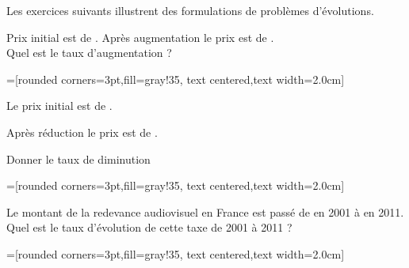 \documentclass[main.tex]{subfiles}
\begin{document}
\vspace{-2.5em}
\begin{eBox}
\noindent Les  exercices suivants illustrent des   formulations de   problèmes d'évolutions. 
\end{eBox}
\begin{exercise}\hfill 
	
	\noindent\parbox{0.70\linewidth}{
Prix initial est de . Après augmentation le prix est de . \\
Quel est le taux d'augmentation ? 
}\parbox{0.23\linewidth}{
=[rounded corners=3pt,fill=gray!35, text centered,text width=2.0cm]
}	 
\end{exercise}
\begin{exercise}\hfill 
	
	\noindent\parbox{0.70\linewidth}{
	Le prix initial est de . 
	
	Après réduction le prix est de .
	
	Donner le taux de diminution   
	}\parbox{0.23\linewidth}{
=[rounded corners=3pt,fill=gray!35, text centered,text width=2.0cm]
	}	 
\end{exercise}
 \begin{exercise}\hfill 
 	 
	\noindent\parbox{0.70\linewidth}{
Le montant de la redevance audiovisuel en France est passé de   en 2001 à   en 2011.\\
Quel est le taux d’évolution de cette taxe de 2001 à 2011 ?
}\parbox{0.23\linewidth}{
	=[rounded corners=3pt,fill=gray!35, text centered,text width=2.0cm]
}
 \end{exercise}
\end{document}
